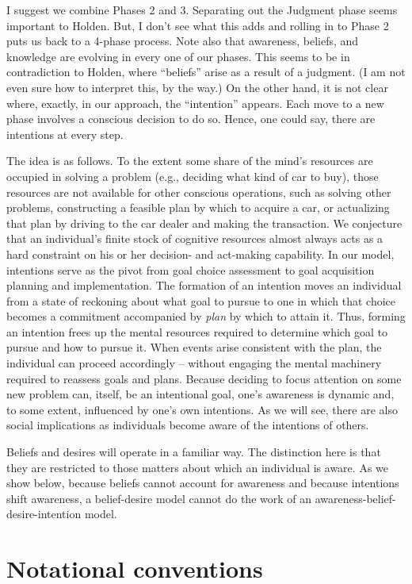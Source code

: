 \documentclass[
11pt,
titlepage,
reqno,
]{article}%
\theoremstyle{definition}
\begin{document}
I suggest we combine Phases 2 and 3. Separating out the Judgment phase seems important to Holden. 
But, I don't see what this adds and rolling in to Phase 2 puts us back to a 4-phase process. 
Note also that awareness, beliefs, and knowledge are evolving in every one of our phases. 
This seems to be in contradiction to Holden, where ``beliefs'' arise as a result of a judgment. 
(I am not even sure how to interpret this, by the way.) 
On the other hand, it is not clear where, exactly, in our approach, the ``intention'' appears. 
Each move to a new phase involves a conscious decision to do so. 
Hence, one could say, there are intentions at every step.

The idea is as follows.
To the extent some share of the mind's resources are occupied in solving a problem (e.g., deciding what kind of car to buy), those resources are not available for other conscious operations, such as solving other problems, constructing a feasible plan by which to acquire a car, or actualizing that plan by driving to the car dealer and making the transaction.
We conjecture that an individual's finite stock of cognitive resources almost always acts as a hard constraint on his or her decision- and act-making capability.
In our model, intentions serve as the pivot from goal choice assessment to goal acquisition planning and implementation.
The formation of an intention moves an individual from a state of reckoning about what goal to pursue to one in which that choice becomes a commitment accompanied by \textit{plan} by which to attain it.
Thus, forming an intention frees up the mental resources required to determine which goal to pursue and how to pursue it.
When events arise consistent with the plan, the individual can proceed accordingly -- without engaging the mental machinery required to reassess goals and plans.
Because deciding to focus attention on some new problem can, itself, be an intentional goal, one's awareness is dynamic and, to some extent, influenced by one's own intentions.
As we will see, there are also social implications as individuals become aware of the intentions of others.  

Beliefs and desires will operate in a familiar way. 
The distinction here is that they are restricted to those matters about which an individual is aware.
As we show below, because beliefs cannot account for awareness and because intentions shift awareness, a belief-desire model cannot do the work of an awareness-belief-desire-intention model.

	
\section{Notational conventions}
\end{document}
